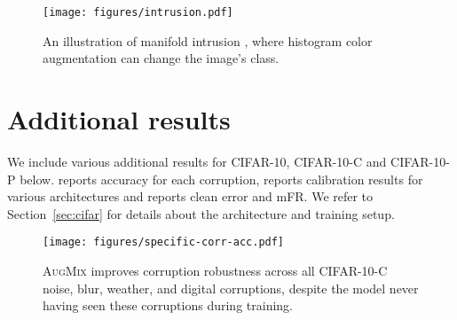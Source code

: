 \documentclass{article} \usepackage{iclr2020_conference,times}
\begin{document}
\begin{figure}[h]
\centering
\texttt{[image: figures/intrusion.pdf]}
\caption{
An illustration of manifold intrusion \citep{GuoMixup}, where histogram color augmentation can change the image's class.}\label{fig:intrusion}
\end{figure}







\section{Additional results}\label{app:additional}
We include various additional results for CIFAR-10, CIFAR-10-C and CIFAR-10-P below.   reports accuracy for each corruption,   reports calibration results for various architectures and  reports clean error and mFR.
We refer to Section~\ref{sec:cifar} for details about the architecture and training setup.

\begin{figure}[ht]
\centering
\texttt{[image: figures/specific-corr-acc.pdf]}
\caption{
\textsc{AugMix} improves corruption robustness across all CIFAR-10-C noise, blur, weather, and digital corruptions, despite the model never having seen these corruptions during training.
}\label{fig:per-corr}
\end{figure}
\end{document}
